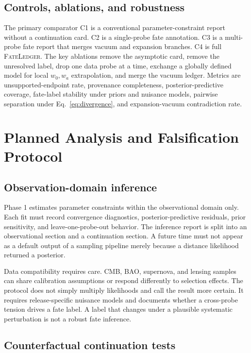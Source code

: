 \documentclass[conference]{IEEEtran}
\newcommand{\fateledger}{\textsc{FateLedger}}
\begin{document}
\subsection{Controls, ablations, and robustness}

The primary comparator C1 is a conventional parameter-constraint report without a continuation card. C2 is a single-probe fate annotation. C3 is a multi-probe fate report that merges vacuum and expansion branches. C4 is full \fateledger{}. The key ablations remove the asymptotic card, remove the unresolved label, drop one data probe at a time, exchange a globally defined model for local \(w_0,w_a\) extrapolation, and merge the vacuum ledger. Metrics are unsupported-endpoint rate, provenance completeness, posterior-predictive coverage, fate-label stability under priors and nuisance models, pairwise separation under Eq.~\eqref{eq:divergence}, and expansion-vacuum contradiction rate.

\section{Planned Analysis and Falsification Protocol}

\subsection{Observation-domain inference}

Phase 1 estimates parameter constraints within the observational domain only. Each fit must record convergence diagnostics, posterior-predictive residuals, prior sensitivity, and leave-one-probe-out behavior. The inference report is split into an observational section and a continuation section. A future time must not appear as a default output of a sampling pipeline merely because a distance likelihood returned a posterior.

Data compatibility requires care. CMB, BAO, supernova, and lensing samples can share calibration assumptions or respond differently to selection effects. The protocol does not simply multiply likelihoods and call the result more certain. It requires release-specific nuisance models and documents whether a cross-probe tension drives a fate label. A label that changes under a plausible systematic perturbation is not a robust fate inference.

\subsection{Counterfactual continuation tests}
\end{document}
